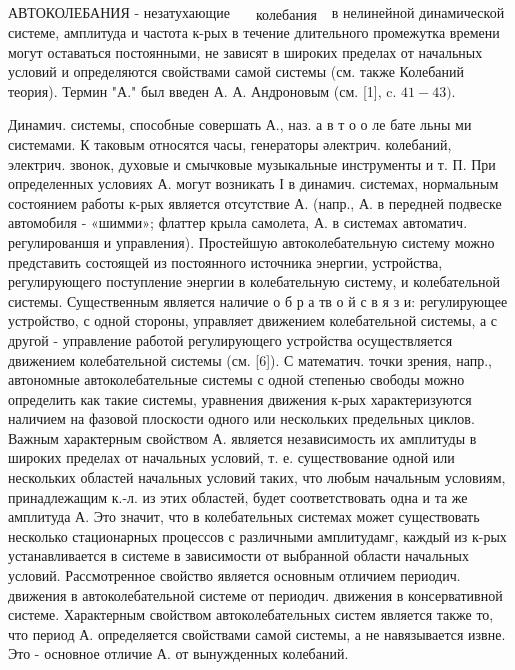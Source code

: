 \documentclass[10pt]{article}
\begin{document}
АВТОКОЛЕБАНИЯ - незатухающие $\begin{aligned} & \text { колебания }\end{aligned}$ в нелинейной динамической системе, амплитуда и частота к-рых в течение длительного промежутка времени могут оставаться постоянными, не зависят в широких пределах от начальных условий и определяются свойствами самой системы (см. также Колебаний теория). Термин "А." был введен А. А. Андроновым (см. [1], c. $41-43)$.



Динамич. системы, способные совершать А., наз. а в т о о ле бате льны ми системами. К таковым относятся часы, генераторы әлектрич. колебаний, электрич. звонок, духовые и смычковые музыкальные инструменты и т. П. При определенных условиях А. могут возникать І в динамич. системах, нормальным состоянием работы к-рых является отсутствие А. (напр., А. в передней подвеске автомобиля - «шимми»; флаттер крыла самолета, А. в системах автоматич. регулированшя и управления). Простейшую автоколебательную систему можно представить состоящей из постоянного источника энергии, устройства, регулирующего поступление энергии в колебательную систему, и колебательной системы. Существенным является наличие о б р а тв о й с в я з и: регулирующее устройство, с одной стороны, управляет движением колебательной системы, а с другой - управление работой регулирующего устройства осуществляется движением колебательной системы (см. [6]). С математич. точки зрения, напр., автономные автоколебательные системы с одной степенью свободы можно определить как такие системы, уравнения движения к-рых характеризуются наличием на фазовой плоскости одного или нескольких предельных циклов. Важным характерным свойством А. является независимость их амплитуды в широких пределах от начальных условий, т. е. существование одной или нескольких областей начальных условий таких, что любым начальным условиям, принадлежащим к.-л. из этих областей, будет соответствовать одна и та же амплитуда А. Это значит, что в колебательных системах может существовать несколько стационарных процессов с различными амплитудамг, каждый из к-рых устанавливается в системе в зависимости от выбранной области начальных условий. Рассмотренное свойство является основным отличием периодич. движения в автоколебательной системе от периодич. движения в консервативной системе. Характерным свойством автоколебательных систем является также то, что период А. определяется свойствами самой системы, а не навязывается извне. Это - основное отличие А. от вынужденных колебаний.
\end{document}
